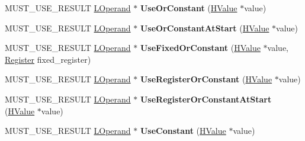 \begin{DoxyCompactItemize}
\item 
M\+U\+S\+T\+\_\+\+U\+S\+E\+\_\+\+R\+E\+S\+U\+LT \hyperlink{classv8_1_1internal_1_1_l_operand}{L\+Operand} $\ast$ {\bfseries Use\+Or\+Constant} (\hyperlink{classv8_1_1internal_1_1_h_value}{H\+Value} $\ast$value)\hypertarget{classv8_1_1internal_1_1_l_chunk_builder_a5607415776a13456e36fa5ba92b8dcdd}{}\label{classv8_1_1internal_1_1_l_chunk_builder_a5607415776a13456e36fa5ba92b8dcdd}

\item 
M\+U\+S\+T\+\_\+\+U\+S\+E\+\_\+\+R\+E\+S\+U\+LT \hyperlink{classv8_1_1internal_1_1_l_operand}{L\+Operand} $\ast$ {\bfseries Use\+Or\+Constant\+At\+Start} (\hyperlink{classv8_1_1internal_1_1_h_value}{H\+Value} $\ast$value)\hypertarget{classv8_1_1internal_1_1_l_chunk_builder_a5338ef34c47b58207b22fd5a66807f85}{}\label{classv8_1_1internal_1_1_l_chunk_builder_a5338ef34c47b58207b22fd5a66807f85}

\item 
M\+U\+S\+T\+\_\+\+U\+S\+E\+\_\+\+R\+E\+S\+U\+LT \hyperlink{classv8_1_1internal_1_1_l_operand}{L\+Operand} $\ast$ {\bfseries Use\+Fixed\+Or\+Constant} (\hyperlink{classv8_1_1internal_1_1_h_value}{H\+Value} $\ast$value, \hyperlink{structv8_1_1internal_1_1_register}{Register} fixed\+\_\+register)\hypertarget{classv8_1_1internal_1_1_l_chunk_builder_a3336afc28a8e888472171b1bda7a4c6c}{}\label{classv8_1_1internal_1_1_l_chunk_builder_a3336afc28a8e888472171b1bda7a4c6c}

\item 
M\+U\+S\+T\+\_\+\+U\+S\+E\+\_\+\+R\+E\+S\+U\+LT \hyperlink{classv8_1_1internal_1_1_l_operand}{L\+Operand} $\ast$ {\bfseries Use\+Register\+Or\+Constant} (\hyperlink{classv8_1_1internal_1_1_h_value}{H\+Value} $\ast$value)\hypertarget{classv8_1_1internal_1_1_l_chunk_builder_aace121601a2caa8e6684cc5d5963f0df}{}\label{classv8_1_1internal_1_1_l_chunk_builder_aace121601a2caa8e6684cc5d5963f0df}

\item 
M\+U\+S\+T\+\_\+\+U\+S\+E\+\_\+\+R\+E\+S\+U\+LT \hyperlink{classv8_1_1internal_1_1_l_operand}{L\+Operand} $\ast$ {\bfseries Use\+Register\+Or\+Constant\+At\+Start} (\hyperlink{classv8_1_1internal_1_1_h_value}{H\+Value} $\ast$value)\hypertarget{classv8_1_1internal_1_1_l_chunk_builder_a14ca10ac408e3ec8501d2875ddf606fc}{}\label{classv8_1_1internal_1_1_l_chunk_builder_a14ca10ac408e3ec8501d2875ddf606fc}

\item 
M\+U\+S\+T\+\_\+\+U\+S\+E\+\_\+\+R\+E\+S\+U\+LT \hyperlink{classv8_1_1internal_1_1_l_operand}{L\+Operand} $\ast$ {\bfseries Use\+Constant} (\hyperlink{classv8_1_1internal_1_1_h_value}{H\+Value} $\ast$value)\hypertarget{classv8_1_1internal_1_1_l_chunk_builder_a6985436610071c802b9a670ae3f60700}{}\label{classv8_1_1internal_1_1_l_chunk_builder_a6985436610071c802b9a670ae3f60700}


\end{DoxyCompactItemize}
